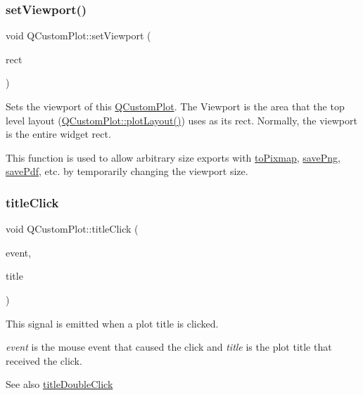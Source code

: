 \subsubsection{\texorpdfstring{set\+Viewport()}{setViewport()}}
{\footnotesize\ttfamily void Q\+Custom\+Plot\+::set\+Viewport (\begin{DoxyParamCaption}\item[{const Q\+Rect \&}]{rect }\end{DoxyParamCaption})}

Sets the viewport of this \hyperlink{class_q_custom_plot}{Q\+Custom\+Plot}. The Viewport is the area that the top level layout (\hyperlink{class_q_custom_plot_af1a1f1f571237deb7c2bd34a5e9f018f}{Q\+Custom\+Plot\+::plot\+Layout()}) uses as its rect. Normally, the viewport is the entire widget rect.

This function is used to allow arbitrary size exports with \hyperlink{class_q_custom_plot_aabb974d71ce96c137dc04eb6eab844fe}{to\+Pixmap}, \hyperlink{class_q_custom_plot_a7636261aff1f6d25c9da749ece3fc8b8}{save\+Png}, \hyperlink{class_q_custom_plot_a632da44c6d94ea8b271eb483b08b5114}{save\+Pdf}, etc. by temporarily changing the viewport size. \hypertarget{class_q_custom_plot_a2137a819e518fee7edd1c0bf5984d8d6}{}\label{class_q_custom_plot_a2137a819e518fee7edd1c0bf5984d8d6} 
\subsubsection{\texorpdfstring{title\+Click}{titleClick}}
{\footnotesize\ttfamily void Q\+Custom\+Plot\+::title\+Click (\begin{DoxyParamCaption}\item[{Q\+Mouse\+Event $\ast$}]{event,  }\item[{\hyperlink{class_q_c_p_plot_title}{Q\+C\+P\+Plot\+Title} $\ast$}]{title }\end{DoxyParamCaption})\hspace{0.3cm}{\ttfamily [signal]}}

This signal is emitted when a plot title is clicked.

{\itshape event} is the mouse event that caused the click and {\itshape title} is the plot title that received the click.

\begin{DoxySeeAlso}{See also}
\hyperlink{class_q_custom_plot_ad51d65f6abf5edfaeef6e0519a4c1a2f}{title\+Double\+Click} 
\end{DoxySeeAlso}
\hypertarget{class_q_custom_plot_ad51d65f6abf5edfaeef6e0519a4c1a2f}{}\label{class_q_custom_plot_ad51d65f6abf5edfaeef6e0519a4c1a2f} 
